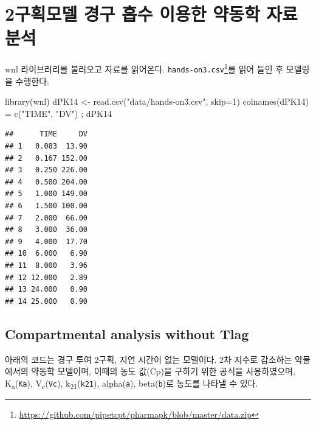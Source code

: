 \documentclass[
  11pt,
  krantz2, a4paper, twoside]{krantz}
\newenvironment{Shaded}{\begin{snugshade}}{\end{snugshade}}
\newcommand{\AttributeTok}[1]{\textcolor[rgb]{0.77,0.63,0.00}{#1}}
\newcommand{\DecValTok}[1]{\textcolor[rgb]{0.00,0.00,0.81}{#1}}
\newcommand{\FunctionTok}[1]{\textcolor[rgb]{0.00,0.00,0.00}{#1}}
\newcommand{\NormalTok}[1]{#1}
\newcommand{\OtherTok}[1]{\textcolor[rgb]{0.56,0.35,0.01}{#1}}
\newcommand{\StringTok}[1]{\textcolor[rgb]{0.31,0.60,0.02}{#1}}
\theoremstyle{definition}
\theoremstyle{definition}
\theoremstyle{definition}
\theoremstyle{definition}
\theoremstyle{remark}
\begin{document}
\normalsize

\hypertarget{uxad6cuxd68duxbaa8uxb378-uxacbduxad6c-uxd761uxc218-uxc774uxc6a9uxd55c-uxc57duxb3d9uxd559-uxc790uxb8cc-uxbd84uxc11d}{%
\section{\texorpdfstring{2구획모델 경구 흡수 이용한 약동학 자료 분석}{2구획모델 경구 흡수 이용한 약동학 자료 분석}}\label{uxad6cuxd68duxbaa8uxb378-uxacbduxad6c-uxd761uxc218-uxc774uxc6a9uxd55c-uxc57duxb3d9uxd559-uxc790uxb8cc-uxbd84uxc11d}}

wnl 라이브러리를 불러오고 자료를 읽어온다.
\texttt{hands-on3.csv}\footnote{\url{https://github.com/pipetcpt/pharmapk/blob/master/data.zip}}를 읽어 들인 후 모델링을 수행한다.

\begin{Shaded}
\begin{Highlighting}[]
\FunctionTok{library}\NormalTok{(wnl)}
\NormalTok{dPK14 }\OtherTok{\textless{}{-}} \FunctionTok{read.csv}\NormalTok{(}\StringTok{"data/hands{-}on3.csv"}\NormalTok{, }\AttributeTok{skip=}\DecValTok{1}\NormalTok{)}
\FunctionTok{colnames}\NormalTok{(dPK14) }\OtherTok{=} \FunctionTok{c}\NormalTok{(}\StringTok{"TIME"}\NormalTok{, }\StringTok{"DV"}\NormalTok{) ; dPK14}
\end{Highlighting}
\end{Shaded}

\begin{verbatim}
##      TIME     DV
## 1   0.083  13.90
## 2   0.167 152.00
## 3   0.250 226.00
## 4   0.500 204.00
## 5   1.000 149.00
## 6   1.500 100.00
## 7   2.000  66.00
## 8   3.000  36.00
## 9   4.000  17.70
## 10  6.000   6.90
## 11  8.000   3.96
## 12 12.000   2.89
## 13 24.000   0.90
## 14 25.000   0.90
\end{verbatim}

\hypertarget{compartmental-analysis-without-tlag-1}{%
\subsection{Compartmental analysis without Tlag}\label{compartmental-analysis-without-tlag-1}}

아래의 코드는 경구 투여 2구획, 지연 시간이 없는 모델이다. 
2차 지수로 감소하는 약물에서의 약동학 모델이며, 이때의 농도 값(Cp)을 구하기 위한 공식을 사용하였으며, K\textsubscript{a}(\texttt{Ka}), V\textsubscript{c}(\texttt{Vc}), k\textsubscript{21}(\texttt{k21}), alpha(\texttt{a}), beta(\texttt{b})로 농도를 나타낼 수 있다.
\end{document}
